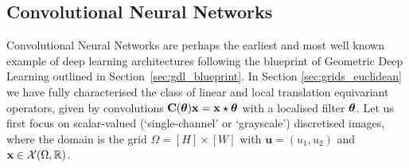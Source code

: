\subsection{Convolutional Neural Networks}
\label{sec:cnnsec}

Convolutional Neural Networks are perhaps the earliest and most well known  example of deep learning architectures following the blueprint of Geometric Deep Learning outlined in Section~\ref{sec:gdl_blueprint}. 
%
%
%
In Section \ref{sec:grids_euclidean} we have fully characterised the class of linear and local translation equivariant operators, given by 
convolutions ${\bf C(\boldsymbol{\theta})}{\bf x} = {\bf x} \star \boldsymbol{\theta}$ with a localised filter $\boldsymbol{\theta}$. 
Let us first focus on scalar-valued (`single-channel' or `grayscale') discretised images,  
where 
the domain is the grid $\Omega = [H] \times [W]$ with $\mathbf{u} = (u_1, u_2)$ and ${\bf x} \in {\mathcal{X}}(\Omega, \mathbb{R})$.

